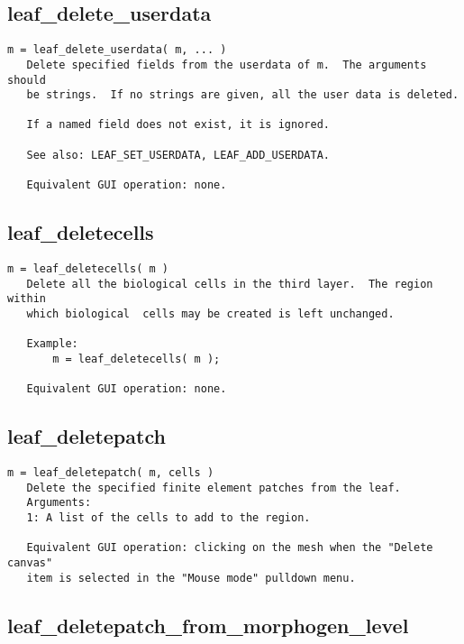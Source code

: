 \subsection{leaf\_delete\_userdata}\label{section-leaf-delete-userdata}

\begin{verbatim}
m = leaf_delete_userdata( m, ... )
   Delete specified fields from the userdata of m.  The arguments should
   be strings.  If no strings are given, all the user data is deleted.

   If a named field does not exist, it is ignored.

   See also: LEAF_SET_USERDATA, LEAF_ADD_USERDATA.

   Equivalent GUI operation: none.
\end{verbatim}

\subsection{leaf\_deletecells}\label{section-leaf-deletecells}

\begin{verbatim}
m = leaf_deletecells( m )
   Delete all the biological cells in the third layer.  The region within
   which biological  cells may be created is left unchanged.

   Example:
       m = leaf_deletecells( m );

   Equivalent GUI operation: none.
\end{verbatim}

\subsection{leaf\_deletepatch}\label{section-leaf-deletepatch}

\begin{verbatim}
m = leaf_deletepatch( m, cells )
   Delete the specified finite element patches from the leaf.
   Arguments:
   1: A list of the cells to add to the region.

   Equivalent GUI operation: clicking on the mesh when the "Delete canvas"
   item is selected in the "Mouse mode" pulldown menu.
\end{verbatim}

\subsection{leaf\_deletepatch\_from\_morphogen\_level}\label{section-leaf-deletepatch-from-morphogen-level}

